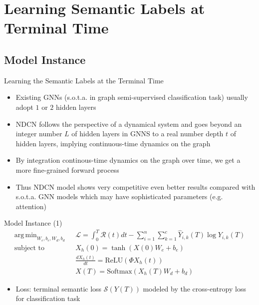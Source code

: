 \documentclass{beamer}
\DeclareMathOperator*{\argmin}{arg\,min}
\begin{document}
\section{Learning Semantic Labels at Terminal Time}
\subsection{Model Instance}
\begin{frame}{Learning the Semantic Labels at the Terminal Time}
\begin{itemize}
\item Existing GNNs (s.o.t.a. in graph semi-supervised classification task) usually adopt $1$ or $2$ hidden layers
\item NDCN follows the perspective of a dynamical system and goes beyond an integer number $L$ of hidden layers in GNNS to a real number depth $t$ of hidden layers, implying continuous-time dynamics on the graph
\item By integration continous-time dynamics on the graph over time, we get a more fine-grained forward process
\item Thus NDCN model shows very competitive even better results compared with s.o.t.a. GNN models which may have sophisticated parameters (e.g. attention)
\end{itemize}
\end{frame}

\begin{frame}{Model Instance (1)}\[
\begin{split}
\argmin_{W_e,b_e,W_d,b_d}\text{ }&\mathcal{L}=\int_0^T\mathcal{R}(t)dt-\sum_{i=1}^n\sum_{k=1}^c\hat{Y}_{i,k}(T)\log Y_{i,k}(T)\\
\text{subject to }&X_h(0)=\tanh(X(0)W_e+b_e)\\
&\frac{dX_h(t)}{dt}=\text{ReLU}(\Phi X_h(t))\\
&X(T)=\text{Softmax}(X_h(T)W_d+b_d)
\end{split}
\]
\begin{itemize}
\item Loss: terminal semantic loss $\mathcal{S}(Y(T))$ modeled by the cross-entropy loss for classification task
\end{itemize}
\end{frame}
\end{document}
